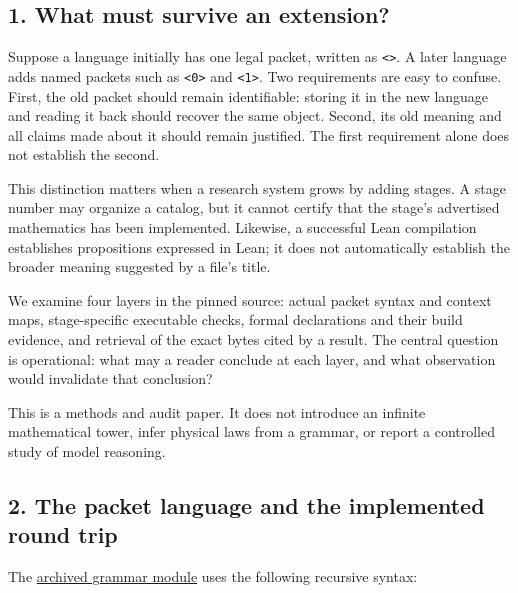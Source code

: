 \documentclass[
  11pt,
]{article}
\newcommand{\passthrough}[1]{#1}
\begin{document}
\hypertarget{what-must-survive-an-extension}{%
\subsection{1. What must survive an
extension?}\label{what-must-survive-an-extension}}

Suppose a language initially has one legal packet, written as
\passthrough{\lstinline!<>!}. A later language adds named packets such
as \passthrough{\lstinline!<0>!} and \passthrough{\lstinline!<1>!}. Two
requirements are easy to confuse. First, the old packet should remain
identifiable: storing it in the new language and reading it back should
recover the same object. Second, its old meaning and all claims made
about it should remain justified. The first requirement alone does not
establish the second.

This distinction matters when a research system grows by adding stages.
A stage number may organize a catalog, but it cannot certify that the
stage's advertised mathematics has been implemented. Likewise, a
successful Lean compilation establishes propositions expressed in Lean;
it does not automatically establish the broader meaning suggested by a
file's title.

We examine four layers in the pinned source: actual packet syntax and
context maps, stage-specific executable checks, formal declarations and
their build evidence, and retrieval of the exact bytes cited by a
result. The central question is operational: what may a reader conclude
at each layer, and what observation would invalidate that conclusion?

This is a methods and audit paper. It does not introduce an infinite
mathematical tower, infer physical laws from a grammar, or report a
controlled study of model reasoning.

\hypertarget{the-packet-language-and-the-implemented-round-trip}{%
\subsection{2. The packet language and the implemented round
trip}\label{the-packet-language-and-the-implemented-round-trip}}

The
\href{https://github.com/dbccpage/the_symbol_game/blob/main/omega_engine_education/documentation/030_pfp_proposal_fidelity_protocol_pfp/papers/omega_engine_symbol_game/008_pfp_mssn_tower_challenges_and_retraction_benchmarks/docs/source_archive/mss0_mss1_52cb5457/grammar.py}{archived
grammar module} uses the following recursive syntax:
\end{document}
